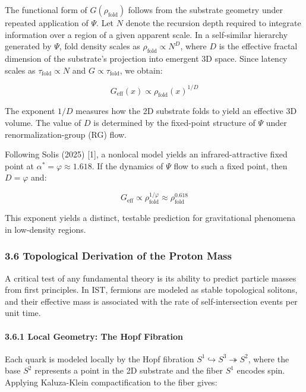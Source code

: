 \documentclass[
]{article}
\begin{document}
The functional form of \(G(\rho_{\text{fold}})\) follows from the
substrate geometry under repeated application of \(\Psi\). Let \(N\)
denote the recursion depth required to integrate information over a
region of a given apparent scale. In a self-similar hierarchy generated
by \(\Psi\), fold density scales as \(\rho_{\text{fold}} \propto N^D\),
where \(D\) is the effective fractal dimension of the substrate's
projection into emergent 3D space. Since latency scales as
\(\tau_{\text{fold}} \propto N\) and \(G \propto \tau_{\text{fold}}\),
we obtain:

\[G_{\text{eff}}(x) \propto \rho_{\text{fold}}(x)^{1/D}\]

The exponent \(1/D\) measures how the 2D substrate folds to yield an
effective 3D volume. The value of \(D\) is determined by the fixed-point
structure of \(\Psi\) under renormalization-group (RG) flow.

Following Solis (2025) {[}1{]}, a nonlocal model yields an
infrared-attractive fixed point at \(\alpha^* = \varphi \approx 1.618\).
If the dynamics of \(\Psi\) flow to such a fixed point, then
\(D = \varphi\) and:

\[G_{\text{eff}} \propto \rho_{\text{fold}}^{1/\varphi} \approx \rho_{\text{fold}}^{0.618}\]

This exponent yields a distinct, testable prediction for gravitational
phenomena in low-density regions.

\subsubsection{3.6 Topological Derivation of the Proton
Mass}\label{topological-derivation-of-the-proton-mass}

A critical test of any fundamental theory is its ability to predict
particle masses from first principles. In IST, fermions are modeled as
stable topological solitons, and their effective mass is associated with
the rate of self-intersection events per unit time.

\paragraph{3.6.1 Local Geometry: The Hopf
Fibration}\label{local-geometry-the-hopf-fibration}

Each quark is modeled locally by the Hopf fibration
\(S^1 \hookrightarrow S^3 \twoheadrightarrow S^2\), where the base
\(S^2\) represents a point in the 2D substrate and the fiber \(S^1\)
encodes spin. Applying Kaluza-Klein compactification to the fiber gives:
\end{document}
